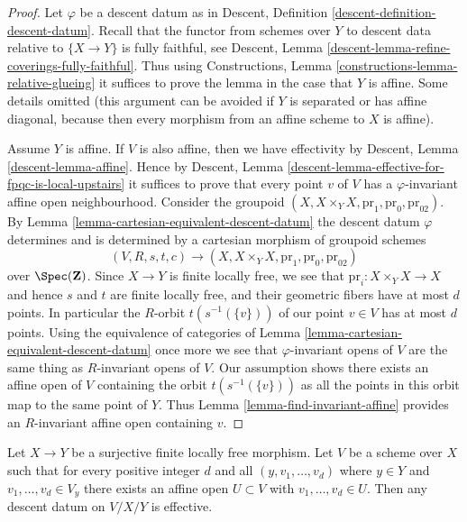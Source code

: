 \begin{proof}
Let $\varphi$ be a descent datum as in
Descent, Definition \ref{descent-definition-descent-datum}.
Recall that the functor from schemes over $Y$ to descent data
relative to $\{X \to Y\}$ is fully faithful, see
Descent, Lemma \ref{descent-lemma-refine-coverings-fully-faithful}.
Thus using Constructions, Lemma \ref{constructions-lemma-relative-glueing}
it suffices to prove the lemma in the case that $Y$ is affine.
Some details omitted (this argument can be avoided if $Y$ is
separated or has affine diagonal, because then every morphism from
an affine scheme to $X$ is affine).

\medskip\noindent
Assume $Y$ is affine. If $V$ is also affine, then we have effectivity by
Descent, Lemma \ref{descent-lemma-affine}. Hence by
Descent, Lemma \ref{descent-lemma-effective-for-fpqc-is-local-upstairs}
it suffices to prove that every point $v$ of $V$ has a $\varphi$-invariant
affine open neighbourhood. Consider the groupoid
$(X, X \times_Y X, \text{pr}_1, \text{pr}_0, \text{pr}_{02})$.
By Lemma \ref{lemma-cartesian-equivalent-descent-datum}
the descent datum $\varphi$ determines and is determined by
a cartesian morphism of groupoid schemes
$$
(V, R, s, t, c)
\longrightarrow
(X, X \times_Y X, \text{pr}_1, \text{pr}_0, \text{pr}_{02})
$$
over $\Spec(\mathbf{Z})$.
Since $X \to Y$ is finite locally free, we see that
$\text{pr}_i : X \times_Y X \to X$ and hence $s$ and $t$
are finite locally free, and their geometric fibers have at most $d$
points. In particular the $R$-orbit $t(s^{-1}(\{v\}))$ of our point
$v \in V$ has at most $d$ points. Using the equivalence of categories of
Lemma \ref{lemma-cartesian-equivalent-descent-datum}
once more we see that $\varphi$-invariant opens of $V$
are the same thing as $R$-invariant opens of $V$.
Our assumption shows there exists an affine open of $V$
containing the orbit $t(s^{-1}(\{v\}))$ as all the points
in this orbit map to the same point of $Y$.
Thus Lemma \ref{lemma-find-invariant-affine}
provides an $R$-invariant affine open containing $v$.
\end{proof}

\begin{lemma}
\label{lemma-descend-along-finite}
Let $X \to Y$ be a surjective finite locally free morphism. 
Let $V$ be a scheme over $X$ such that for every positive integer $d$ and all
$(y, v_1, \ldots, v_d)$ where $y \in Y$ and
$v_1, \ldots, v_d \in V_y$ there exists an affine open
$U \subset V$ with $v_1, \ldots, v_d \in U$.
Then any descent datum on $V/X/Y$ is effective.
\end{lemma}


